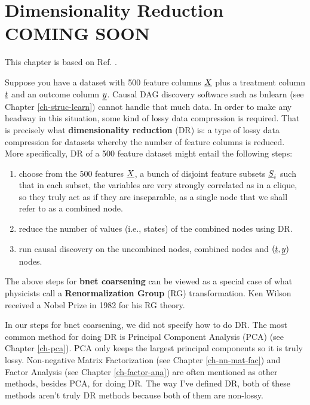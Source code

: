 \chapter{Dimensionality Reduction COMING SOON}
\label{ch-dim-reduc}


This chapter is based on Ref. \cite{wiki-dim-reduc}.


Suppose you have a dataset with 500 feature columns ${\underline{X}}$ plus a treatment
column ${\underline{t}}$ and an outcome column ${\underline{y}}$.
Causal DAG discovery software such as  bnlearn (see Chapter \ref{ch-struc-learn}) 
cannot handle that much data.
In order to make any headway in this situation,
some kind of lossy data compression is required. That is precisely what {\bf dimensionality reduction} (DR) is: a type
of lossy data compression for datasets whereby the number of feature columns is reduced.
More specifically, DR of a 500 feature dataset might entail the 
following steps:
\begin{enumerate}

\item choose from the 500 features ${\underline{X}}$, a bunch of disjoint feature subsets ${\underline{S}}_i$ such that in each subset, the variables are very strongly correlated as in a clique, so they truly act as if they are inseparable, as a single node that we shall refer to as a combined node.

\item reduce the number of values (i.e., states) of the combined nodes using DR.

\item run causal discovery on the uncombined nodes, combined nodes and $({\underline{t}}, {\underline{y}})$
 nodes.
\end{enumerate}

The above steps for {\bf bnet  coarsening} can be
viewed as a special case of what physicists call a {\bf Renormalization Group} (RG) transformation. Ken Wilson received a Nobel Prize in 1982 for his RG theory.

In our steps for bnet coarsening,
we did not specify how to do DR. 
The most common
method for doing DR is
Principal Component Analysis (PCA)
(see Chapter \ref{ch-pca}). PCA 
only keeps the largest principal 
components so it is truly lossy. Non-negative Matrix Factorization 
(see Chapter \ref{ch-nn-mat-fac})
and Factor Analysis (see Chapter \ref{ch-factor-ana})
are often mentioned as other
methods, besides PCA, for doing DR. The way I've
defined DR, both of these methods aren't truly DR methods because both of them are non-lossy.
